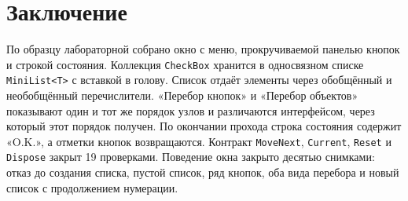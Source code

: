 \documentclass[a4paper,14pt]{extarticle}
\begin{document}
\section*{Заключение}
По образцу лабораторной собрано окно с меню, прокручиваемой панелью кнопок и строкой состояния. Коллекция \texttt{CheckBox} хранится в односвязном списке \texttt{MiniList<T>} с вставкой в голову. Список отдаёт элементы через обобщённый и необобщённый перечислители. «Перебор кнопок» и «Перебор объектов» показывают один и тот же порядок узлов и различаются интерфейсом, через который этот порядок получен. По окончании прохода строка состояния содержит «O.K.», а отметки кнопок возвращаются. Контракт \texttt{MoveNext}, \texttt{Current}, \texttt{Reset} и \texttt{Dispose} закрыт 19 проверками. Поведение окна закрыто десятью снимками: отказ до создания списка, пустой список, ряд кнопок, оба вида перебора и новый список с продолжением нумерации.
\end{document}
